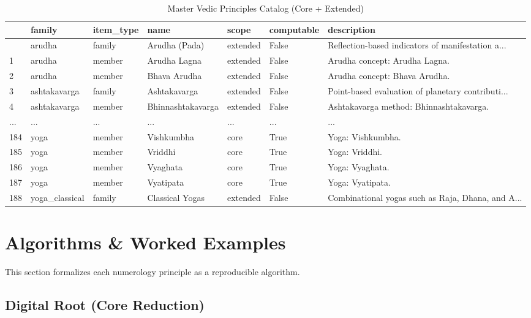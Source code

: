 \documentclass[
  american,
  11pt,
  oneside,
  openany]{article}
\begin{document}
\begin{longtable}[]{@{}lllllll@{}}

\caption{\label{tbl-num-vedic-master}Master Vedic Principles Catalog
(Core + Extended)}

\tabularnewline

\toprule\noalign{}
& family & item\_type & name & scope & computable & description \\
\midrule\noalign{}
\endhead
\bottomrule\noalign{}
\endlastfoot
0 & arudha & family & Arudha (Pada) & extended & False &
Reflection-based indicators of manifestation a... \\
1 & arudha & member & Arudha Lagna & extended & False & Arudha concept:
Arudha Lagna. \\
2 & arudha & member & Bhava Arudha & extended & False & Arudha concept:
Bhava Arudha. \\
3 & ashtakavarga & family & Ashtakavarga & extended & False &
Point-based evaluation of planetary contributi... \\
4 & ashtakavarga & member & Bhinnashtakavarga & extended & False &
Ashtakavarga method: Bhinnashtakavarga. \\
... & ... & ... & ... & ... & ... & ... \\
184 & yoga & member & Vishkumbha & core & True & Yoga: Vishkumbha. \\
185 & yoga & member & Vriddhi & core & True & Yoga: Vriddhi. \\
186 & yoga & member & Vyaghata & core & True & Yoga: Vyaghata. \\
187 & yoga & member & Vyatipata & core & True & Yoga: Vyatipata. \\
188 & yoga\_classical & family & Classical Yogas & extended & False &
Combinational yogas such as Raja, Dhana, and A... \\

\end{longtable}

\section{Algorithms \& Worked
Examples}\label{algorithms-worked-examples}

This section formalizes each numerology principle as a reproducible
algorithm.

\subsection{Digital Root (Core
Reduction)}\label{digital-root-core-reduction}
\end{document}
